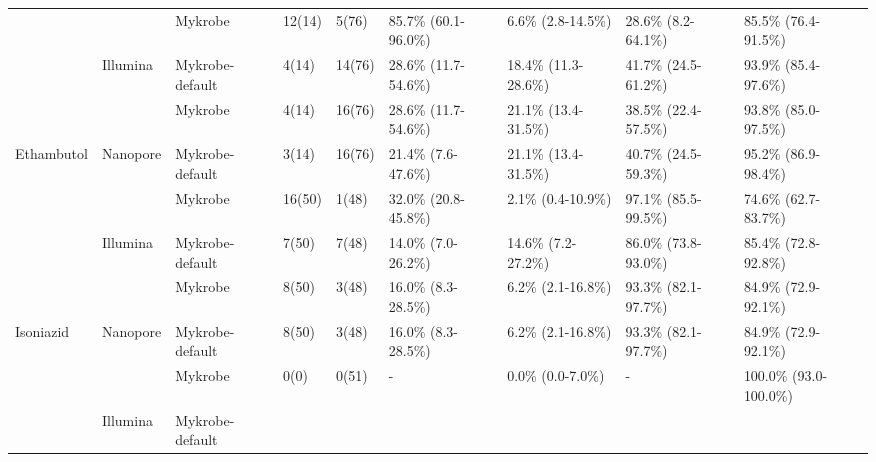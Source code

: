 \begin{table}
{\begin{tabular}{|l|l|l|l|l|l|l|l|l|}
 &
   &
  Mykrobe &
  12(14) &
  5(76) &
  85.7\% (60.1-96.0\%) &
  6.6\% (2.8-14.5\%) &
  28.6\% (8.2-64.1\%) &
  85.5\% (76.4-91.5\%) \\ \cline{3-9} 
 &
  \multirow{-2}{*}{Illumina} &
  \cellcolor[HTML]{EFEFEF}Mykrobe-default &
  \cellcolor[HTML]{EFEFEF}4(14) &
  \cellcolor[HTML]{EFEFEF}14(76) &
  \cellcolor[HTML]{EFEFEF}28.6\% (11.7-54.6\%) &
  \cellcolor[HTML]{EFEFEF}18.4\% (11.3-28.6\%) &
  \cellcolor[HTML]{EFEFEF}41.7\% (24.5-61.2\%) &
  \cellcolor[HTML]{EFEFEF}93.9\% (85.4-97.6\%) \\ \cline{2-9} 
 &
   &
  Mykrobe &
  4(14) &
  16(76) &
  28.6\% (11.7-54.6\%) &
  21.1\% (13.4-31.5\%) &
  38.5\% (22.4-57.5\%) &
  93.8\% (85.0-97.5\%) \\ \cline{3-9} 
\multirow{-4}{*}{Ethambutol} &
  \multirow{-2}{*}{Nanopore} &
  \cellcolor[HTML]{EFEFEF}Mykrobe-default &
  \cellcolor[HTML]{EFEFEF}3(14) &
  \cellcolor[HTML]{EFEFEF}16(76) &
  \cellcolor[HTML]{EFEFEF}21.4\% (7.6-47.6\%) &
  \cellcolor[HTML]{EFEFEF}21.1\% (13.4-31.5\%) &
  \cellcolor[HTML]{EFEFEF}40.7\% (24.5-59.3\%) &
  \cellcolor[HTML]{EFEFEF}95.2\% (86.9-98.4\%) \\ \hline
 &
   &
  Mykrobe &
  16(50) &
  1(48) &
  32.0\% (20.8-45.8\%) &
  2.1\% (0.4-10.9\%) &
  97.1\% (85.5-99.5\%) &
  74.6\% (62.7-83.7\%) \\ \cline{3-9} 
 &
  \multirow{-2}{*}{Illumina} &
  \cellcolor[HTML]{EFEFEF}Mykrobe-default &
  \cellcolor[HTML]{EFEFEF}7(50) &
  \cellcolor[HTML]{EFEFEF}7(48) &
  \cellcolor[HTML]{EFEFEF}14.0\% (7.0-26.2\%) &
  \cellcolor[HTML]{EFEFEF}14.6\% (7.2-27.2\%) &
  \cellcolor[HTML]{EFEFEF}86.0\% (73.8-93.0\%) &
  \cellcolor[HTML]{EFEFEF}85.4\% (72.8-92.8\%) \\ \cline{2-9} 
 &
   &
  Mykrobe &
  8(50) &
  3(48) &
  16.0\% (8.3-28.5\%) &
  6.2\% (2.1-16.8\%) &
  93.3\% (82.1-97.7\%) &
  84.9\% (72.9-92.1\%) \\ \cline{3-9} 
\multirow{-4}{*}{Isoniazid} &
  \multirow{-2}{*}{Nanopore} &
  \cellcolor[HTML]{EFEFEF}Mykrobe-default &
  \cellcolor[HTML]{EFEFEF}8(50) &
  \cellcolor[HTML]{EFEFEF}3(48) &
  \cellcolor[HTML]{EFEFEF}16.0\% (8.3-28.5\%) &
  \cellcolor[HTML]{EFEFEF}6.2\% (2.1-16.8\%) &
  \cellcolor[HTML]{EFEFEF}93.3\% (82.1-97.7\%) &
  \cellcolor[HTML]{EFEFEF}84.9\% (72.9-92.1\%) \\ \hline
 &
   &
  Mykrobe &
  0(0) &
  0(51) &
  - &
  0.0\% (0.0-7.0\%) &
  - &
  100.0\% (93.0-100.0\%) \\ \cline{3-9} 
 &
  \multirow{-2}{*}{Illumina} &
  \cellcolor[HTML]{EFEFEF}Mykrobe-default &

\end{tabular}}
\end{table}

